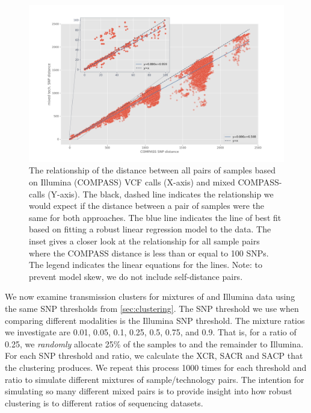 \begin{figure}
\begin{center}
\includegraphics[width=0.90\columnwidth]{Chapter2/Figs/mixed-dotplot.png}
\caption{{The relationship of the distance between all pairs of samples based on Illumina (COMPASS) VCF calls (X-axis) and mixed COMPASS-\bcftools{} calls (Y-axis). The black, dashed line indicates the relationship we would expect if the distance between a pair of samples were the same for both approaches. The blue line indicates the line of best fit based on fitting a robust linear regression model to the data. The inset gives a closer look at the relationship for all sample pairs where the COMPASS distance is less than or equal to 100 SNPs. The legend indicates the linear equations for the lines. Note: to prevent model skew, we do not include self-distance pairs.
{\label{fig:mixed-dotplot}}
}}
\end{center}
\end{figure}

\noindent
We now examine transmission clusters for mixtures of \ont{} and Illumina data using the same SNP thresholds from \autoref{sec:clustering}. The SNP threshold we use when comparing different modalities is the Illumina SNP threshold. The mixture ratios we investigate are 0.01, 0.05, 0.1, 0.25, 0.5, 0.75, and 0.9. That is, for a ratio of 0.25, we \emph{randomly} allocate 25\% of the samples to \ont{} and the remainder to Illumina. For each SNP threshold and ratio, we calculate the XCR, SACR and SACP that the clustering produces. We repeat this process 1000 times for each threshold and ratio to simulate different mixtures of sample/technology pairs. The intention for simulating so many different mixed pairs is to provide insight into how robust clustering is to different ratios of sequencing datasets.  

